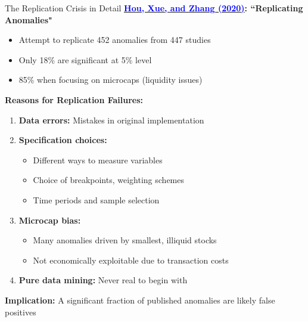 \documentclass{beamer}
\begin{document}
\begin{frame}{The Replication Crisis in Detail}
    \textbf{\href{https://doi.org/10.1093/rfs/hhy131}{\textcolor{blue}{Hou, Xue, and Zhang (2020)}}: ``Replicating Anomalies"}
    \begin{itemize}
        \item Attempt to replicate 452 anomalies from 447 studies
        \item Only 18\% are significant at 5\% level
        \item 85\% when focusing on microcaps (liquidity issues)
    \end{itemize}
    
    \vspace{0.3cm}
    \textbf{Reasons for Replication Failures:}
    \begin{enumerate}
        \item \textbf{Data errors:} Mistakes in original implementation
        \item \textbf{Specification choices:} 
        \begin{itemize}
            \item Different ways to measure variables
            \item Choice of breakpoints, weighting schemes
            \item Time periods and sample selection
        \end{itemize}
        \item \textbf{Microcap bias:}
        \begin{itemize}
            \item Many anomalies driven by smallest, illiquid stocks
            \item Not economically exploitable due to transaction costs
        \end{itemize}
        \item \textbf{Pure data mining:} Never real to begin with
    \end{enumerate}

    \textbf{Implication:} A significant fraction of published anomalies are likely false positives
\end{frame}
\end{document}
